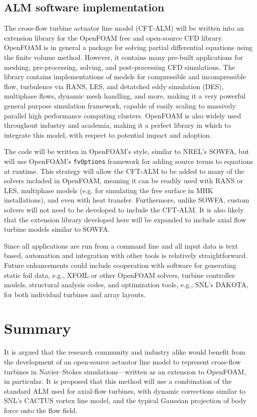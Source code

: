 \subsection{ALM software implementation}

The cross-flow turbine actuator line model (CFT-ALM) will be written into an
extension library for the OpenFOAM free and open-source CFD library. OpenFOAM is
in general a package for solving partial differential equations using the finite
volume method. However, it contains many pre-built applications for meshing,
pre-processing, solving, and post-processing CFD simulations. The library
contains implementations of models for compressible and incompressible flow,
turbulence via RANS, LES, and detatched eddy simulation (DES), multiphase flows,
dynamic mesh handling, and more, making it a very powerful general purpose
simulation framework, capable of easily scaling to massively parallel high
performance computing clusters. OpenFOAM is also widely used throughout industry
and academia, making it a perfect library in which to integrate this model, with
respect to potential impact and adoption.

The code will be written in OpenFOAM's style, similar to NREL's SOWFA, but will
use OpenFOAM's \texttt{fvOptions} framework for adding source terms to equations
at runtime. This strategy will allow the CFT-ALM to be added to many of the
solvers included in OpenFOAM, meaning it can be readily used with RANS or LES,
multiphase models (e.g. for simulating the free surface in MHK installations),
and even with heat transfer. Furthermore, unlike SOWFA, custom solvers will not
need to be developed to include the CFT-ALM. It is also likely that the
extension library developed here will be expanded to include axial flow turbine
models similar to SOWFA.

Since all applications are run from a command line and all input data is text
based, automation and integration with other tools is relatively
straightforward. Future enhancements could include cooperation with software for
generating static foil data, e.g., XFOIL or other OpenFOAM solvers, turbine
controller models, structural analysis codes, and optimization tools, e.g.,
SNL's DAKOTA, for both individual turbines and array layouts.


\section{Summary}

It is argued that the research community and industry alike would benefit from
the development of an open-source actuator line model to represent cross-flow
turbines in Navier--Stokes simulations---written as an extension to OpenFOAM, in
particular. It is proposed that this method will use a combination of the
standard ALM used for axial-flow turbines, with dynamic corrections similar to
SNL's CACTUS vortex line model, and the typical Gaussian projection of body
force onto the flow field.

